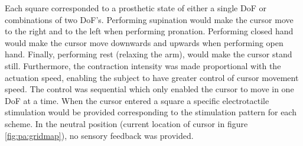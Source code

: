 Each square corresponded to a prosthetic state of either a single DoF or combinations of two DoF's. Performing supination would make the cursor move to the right and to the left when performing pronation. Performing closed hand would make the cursor move downwards and upwards when performing open hand. Finally, performing rest (relaxing the arm), would make the cursor stand still. Furthermore, the contraction intensity was made proportional with the actuation speed, enabling the subject to have greater control of cursor movement speed. The control was sequential which only enabled the cursor to move in one DoF at a time. When the cursor entered a square a specific electrotactile stimulation would be provided corresponding to the stimulation pattern for each scheme. In the neutral position (current location of cursor in figure \ref{fig:pa:gridmap}), no sensory feedback was provided.     


